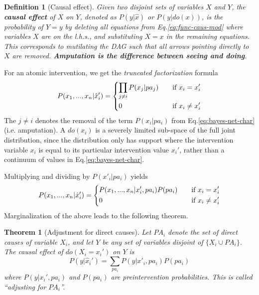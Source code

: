 \documentclass[11pt]{article}
\numberwithin{equation}{section}
\newtheorem{thm}{Theorem}[section]
\newtheorem{defn}{Definition}[section]
\begin{document}
\begin{defn}[Causal effect]
Given two disjoint sets of variables $X$ and $Y$, the \textbf{causal effect} of $X$ on $Y$, denoted as $P(y|\hat{x})$ or $P(y|do(x))$, is the probability of $Y=y$ by deleting all equations from Eq.\eqref{eq:func-caus-mod} where variables $X$ are on the l.h.s., and substituting $X=x$ in the remaining equations. This corresponds to mutilating the DAG such that all arrows pointing directly to $X$ are removed. \textbf{Amputation is the difference between seeing and doing}.
\end{defn}

For an atomic intervention, we get the \textit{truncated factorization} formula
\begin{equation}
P(x_1,...,x_n|\hat{x}'_i)=\begin{dcases}
\prod_{j\neq i} P(x_j|pa_j) \quad &\text{if}\ x_i = x_i'\\
0 &\text{if}\ x_i \neq x_i'
\end{dcases}
\end{equation}
The $j\neq i$ denotes the removal of the term $P(x_i|pa_i)$ from Eq.\eqref{eq:bayes-net-char} (i.e. amputation). A $do(x_i)$ is a severely limited sub-space of the full joint distribution, since the distribution only has support where the intervention variable $x_i$ is equal to its particular intervention value $x_i'$, rather than a continuum of values in Eq.\eqref{eq:bayes-net-char}.

Multiplying and dividing by $P(x'_i|pa_i)$ yields
\begin{equation}
P(x_1,...,x_n|\hat{x}'_i)=\begin{dcases}
P(x_1,...,x_n|x_i',pa_i)P(pa_i) \quad &\text{if}\ x_i = x_i'\\
0 &\text{if}\ x_i \neq x_i'
\end{dcases}
\end{equation}
Marginalization of the above leads to the following theorem.

\begin{thm}[Adjustment for direct causes]
Let $PA_i$ denote the set of direct causes of variable $X_i$, and let $Y$ be any set of variables disjoint of $\{X_i \cup PA_i \}$. The causal effect of $do(X_i=x_i')$ on $Y$ is
\begin{equation}
P(y|\hat{x}_i') = \sum_{pa_i} P(y | x'_i, pa_i) P(pa_i)
\end{equation}
where $P(y|x_i', pa_i)$ and $P(pa_i)$ are preintervention probabilities. This is called ``adjusting for $PA_i$''.
\end{thm}
\end{document}
